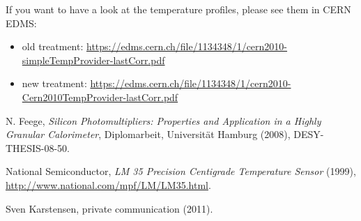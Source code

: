 \documentclass[a4paper,10pt]{article}
\begin{document}
If you want to have a look at the temperature profiles, please see them in CERN EDMS: 
\begin{itemize}
\item old treatment: 
\href{https://edms.cern.ch/file/1134348/1/cern2010-simpleTempProvider-lastCorr.pdf}{https://edms.cern.ch/file/1134348/1/cern2010-simpleTempProvider-lastCorr.pdf}
\item new treatment: 
\href{https://edms.cern.ch/file/1134348/1/cern2010-Cern2010TempProvider-lastCorr.pdf}
{https://edms.cern.ch/file/1134348/1/cern2010-Cern2010TempProvider-lastCorr.pdf}
\end{itemize}





\begin{thebibliography}{9}


 N. Feege, \emph{Silicon Photomultipliers: Properties and Application
in a Highly Granular Calorimeter}, Diplomarbeit, Universit\"at Hamburg (2008),
DESY-THESIS-08-50.

 National Semiconductor, \emph{LM 35 Precision Centigrade Temperature Sensor} (1999),
\href{http://www.national.com/mpf/LM/LM35.html}{http://www.national.com/mpf/LM/LM35.html}.

 Sven Karstensen, private communication (2011).
\end{thebibliography}



\end{document}
